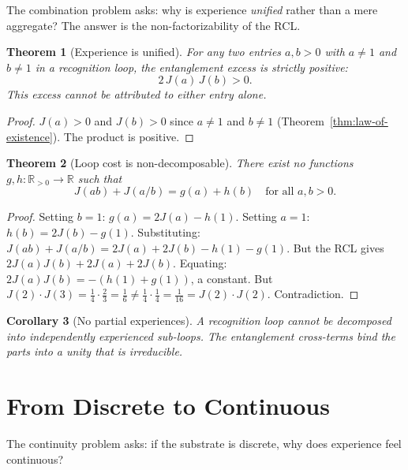 \documentclass[11pt,a4paper]{article}
\theoremstyle{plain}
\newtheorem{theorem}{Theorem}[section]
\newtheorem{corollary}[theorem]{Corollary}
\theoremstyle{definition}
\theoremstyle{remark}
\newcommand{\R}{\mathbb{R}}
\newcommand{\Rp}{\mathbb{R}_{>0}}
\newcommand{\Jcost}{J}
\begin{document}
The combination problem asks: why is experience \emph{unified} rather
than a mere aggregate?  The answer is the non-factorizability of the
RCL.

\begin{theorem}[Experience is unified]
\label{thm:unified}
For any two entries $a, b > 0$ with $a \neq 1$ and $b \neq 1$ in a
recognition loop, the entanglement excess is strictly positive:
\[
  2\,\Jcost(a)\,\Jcost(b) > 0.
\]
This excess cannot be attributed to either entry alone.
\end{theorem}

\begin{proof}
$\Jcost(a) > 0$ and $\Jcost(b) > 0$ since $a \neq 1$ and $b \neq 1$
(Theorem~\ref{thm:law-of-existence}).  The product is positive.
\end{proof}

\begin{theorem}[Loop cost is non-decomposable]
\label{thm:non-decomp}
There exist no functions $g, h : \Rp \to \R$ such that
\[
  \Jcost(ab) + \Jcost(a/b) = g(a) + h(b)
  \quad \text{for all } a, b > 0.
\]
\end{theorem}

\begin{proof}
Setting $b = 1$: $g(a) = 2\Jcost(a) - h(1)$.  Setting $a = 1$:
$h(b) = 2\Jcost(b) - g(1)$.  Substituting:
$\Jcost(ab) + \Jcost(a/b) = 2\Jcost(a) + 2\Jcost(b) - h(1) - g(1)$.
But the RCL gives $2\Jcost(a)\Jcost(b) + 2\Jcost(a) + 2\Jcost(b)$.
Equating: $2\Jcost(a)\Jcost(b) = -(h(1) + g(1))$, a constant.  But
$\Jcost(2)\cdot\Jcost(3) = \tfrac14 \cdot \tfrac23 = \tfrac16 \neq
\tfrac14 \cdot \tfrac14 = \tfrac{1}{16} = \Jcost(2)\cdot\Jcost(2)$.
Contradiction.
\end{proof}

\begin{corollary}[No partial experiences]
A recognition loop cannot be decomposed into independently experienced
sub-loops.  The entanglement cross-terms bind the parts into a unity
that is irreducible.
\end{corollary}

\section{From Discrete to Continuous}
\label{sec:discrete-continuous}

The continuity problem asks: if the substrate is discrete, why does
experience feel continuous?
\end{document}
